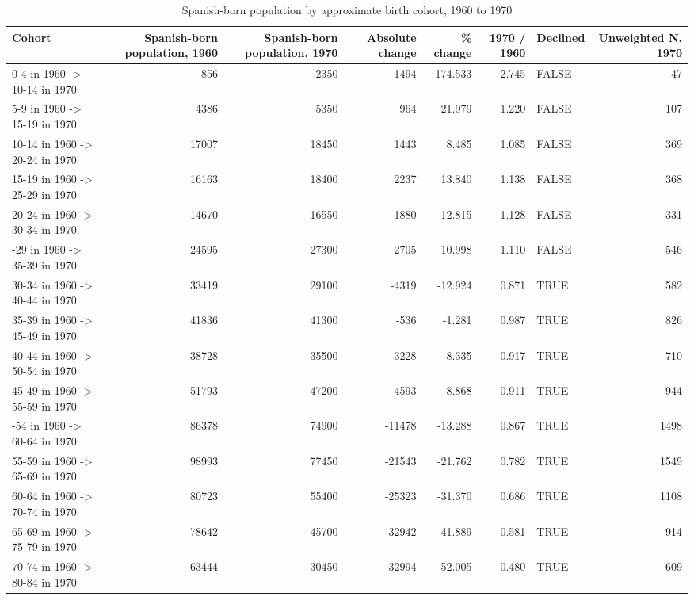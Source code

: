 \begin{table}

\caption{Spanish-born population by approximate birth cohort, 1960 to 1970}
\centering
\begin{tabular}[t]{lrrrrrlr}
\toprule
Cohort & Spanish-born population, 1960 & Spanish-born population, 1970 & Absolute change & \% change & 1970 / 1960 & Declined & Unweighted N, 1970\\
\midrule
0-4 in 1960 -> 10-14 in 1970 & 856 & 2350 & 1494 & 174.533 & 2.745 & FALSE & 47\\
5-9 in 1960 -> 15-19 in 1970 & 4386 & 5350 & 964 & 21.979 & 1.220 & FALSE & 107\\
10-14 in 1960 -> 20-24 in 1970 & 17007 & 18450 & 1443 & 8.485 & 1.085 & FALSE & 369\\
15-19 in 1960 -> 25-29 in 1970 & 16163 & 18400 & 2237 & 13.840 & 1.138 & FALSE & 368\\
20-24 in 1960 -> 30-34 in 1970 & 14670 & 16550 & 1880 & 12.815 & 1.128 & FALSE & 331\\
\addlinespace
25-29 in 1960 -> 35-39 in 1970 & 24595 & 27300 & 2705 & 10.998 & 1.110 & FALSE & 546\\
30-34 in 1960 -> 40-44 in 1970 & 33419 & 29100 & -4319 & -12.924 & 0.871 & TRUE & 582\\
35-39 in 1960 -> 45-49 in 1970 & 41836 & 41300 & -536 & -1.281 & 0.987 & TRUE & 826\\
40-44 in 1960 -> 50-54 in 1970 & 38728 & 35500 & -3228 & -8.335 & 0.917 & TRUE & 710\\
45-49 in 1960 -> 55-59 in 1970 & 51793 & 47200 & -4593 & -8.868 & 0.911 & TRUE & 944\\
\addlinespace
50-54 in 1960 -> 60-64 in 1970 & 86378 & 74900 & -11478 & -13.288 & 0.867 & TRUE & 1498\\
55-59 in 1960 -> 65-69 in 1970 & 98993 & 77450 & -21543 & -21.762 & 0.782 & TRUE & 1549\\
60-64 in 1960 -> 70-74 in 1970 & 80723 & 55400 & -25323 & -31.370 & 0.686 & TRUE & 1108\\
65-69 in 1960 -> 75-79 in 1970 & 78642 & 45700 & -32942 & -41.889 & 0.581 & TRUE & 914\\
70-74 in 1960 -> 80-84 in 1970 & 63444 & 30450 & -32994 & -52.005 & 0.480 & TRUE & 609\\
\bottomrule
\end{tabular}
\end{table}
